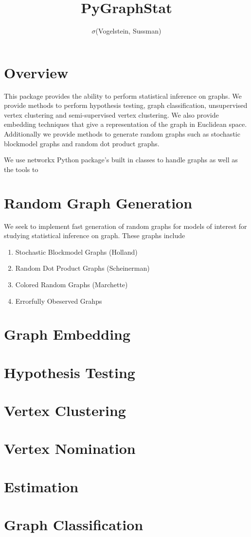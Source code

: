 \documentclass{article}
\theoremstyle{definition}
\begin{document}
\title{PyGraphStat}
\author{$\sigma$(Vogelstein, Sussman)}

\maketitle

\section{Overview} 
This package provides the ability to perform statistical inference on graphs. We provide methods to perform hypothesis testing, graph classification, 
unsupervised vertex clustering and semi-supervised vertex clustering. We also provide embedding techniques that give a representation of the graph in Euclidean space. Additionally we provide methods to generate random graphs such as stochastic blockmodel graphs and random dot product graphs.

We use networkx Python package's built in classes to handle graphs as well as the tools to 

\section{Random Graph Generation}
We seek to implement fast generation of random graphs for models of interest for studying statistical inference on graph. These graphs include 
\begin{enumerate}
  \item Stochastic Blockmodel Graphs \citep{Holland}(Holland)
  \item Random Dot Product Graphs \citep{Scheinerman}(Scheinerman)
  \item Colored Random Graphs \citep{Marchette}(Marchette)
  \item Errorfully Obeserved Grahps \citep{PriebeBock}
\end{enumerate}

\section{Graph Embedding}

\section{Hypothesis Testing}

\section{Vertex Clustering}

\section{Vertex Nomination}

\section{Estimation}


\section{Graph Classification}
\end{document}
